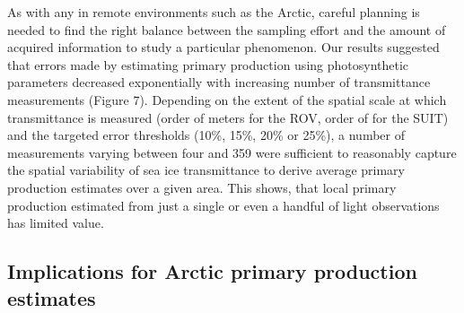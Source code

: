 \DIFdelbegin {}\DIFdelend As with any \DIFdelbegin {}\DIFdelend \DIFaddbegin {}\DIFaddend in remote environments such as the Arctic, careful planning is needed to find the right balance between the sampling effort and the \DIFdelbegin {}\DIFdelend \DIFaddbegin {}\DIFaddend amount of acquired information to study a particular phenomenon. Our results suggested that errors made by estimating primary production using photosynthetic parameters decreased exponentially with increasing number of transmittance measurements (Figure 7). Depending on the extent of the spatial scale at which transmittance is measured (order of meters for the ROV, order of \DIFdelbegin {}\DIFdelend \DIFaddbegin {}\DIFaddend for the SUIT) and the targeted error thresholds (10\%, 15\%, 20\% or 25\%), a number of \DIFaddbegin {}\DIFaddend measurements varying between four and 359 were sufficient to reasonably capture the spatial variability of sea ice transmittance to derive average primary production estimates over a given area. This shows, that local primary production estimated from just a single or even a handful of light observations has limited value.

\subsection{Implications for Arctic primary production estimates}

